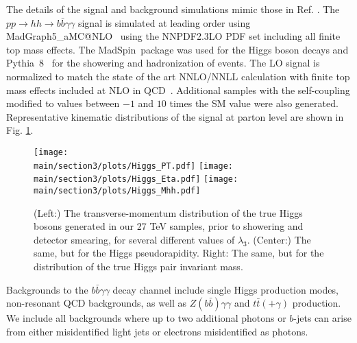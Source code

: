 The details of the signal and background simulations mimic those in Ref. \cite{Homiller:2018dgu}. 
The $pp \rightarrow hh \rightarrow b\bar{b}\gamma\gamma$ signal is simulated at leading order using {\sc\small MadGraph5\_aMC@NLO}\ \cite{Alwall:2014hca, Hirschi:2015iia} using the NNPDF2.3LO PDF set \cite{Ball:2014uwa} including all finite top mass effects. The {\sc\small MadSpin}\ package \cite{Artoisenet:2012st} was used for the Higgs boson decays and {\sc\small Pythia~8}\ \cite{Sjostrand:2014zea} for the showering and hadronization of events. The LO signal is normalized to match the state of the art NNLO/NNLL calculation with finite top mass effects included at NLO in QCD~\cite{Grazzini:2018bsd}. Additional samples with the self-coupling modified to values between $-1$ and $10$ times the SM value were also generated. Representative kinematic distributions of the signal at parton level are shown in Fig. \ref{fig:dihiggs_kinematics}.

\begin{figure}[h]
\centering
	\texttt{[image: \\main/section3/plots/Higgs\_PT.pdf]}
	\hfill
	\texttt{[image: \\main/section3/plots/Higgs\_Eta.pdf]}
	\hfill
	\texttt{[image: \\main/section3/plots/Higgs\_Mhh.pdf]}
\caption{(Left:) The transverse-momentum distribution of the true Higgs bosons generated in our 27 TeV samples, prior to showering and detector smearing, for several different values of $\lambda_3$. (Center:) The same, but for the Higgs pseudorapidity. Right: The same, but for the distribution of the true Higgs pair invariant mass.}\label{fig:dihiggs_kinematics}
\end{figure}

Backgrounds to the $b\bar{b}\gamma\gamma$ decay channel include single Higgs production modes, non-resonant QCD backgrounds, as well as $Z(b\bar{b})\gamma\gamma$ and $t\bar{t}(+\gamma)$ production. We include all backgrounds where up to two additional photons or $b$-jets can arise from either misidentified light jets or electrons misidentified as photons.

